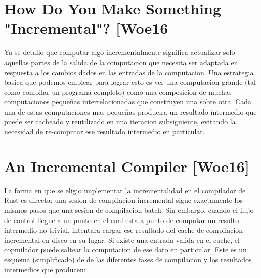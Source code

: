\documentclass[12pt, a4paper]{report}
\begin{document}
\section*{How Do You Make Something "Incremental"? [Woe16}

Ya se detallo que computar algo incrementalmente significa actualizar solo aquellas partes de la salida de la computacion que necesita ser adaptada en respuesta a los cambios dados en las entradas de la computacion.
Una estrategia basica que podemos emplear para lograr esto es ver una computacion grande (tal como compilar un programa completo) como una composicion de muchas computaciones pequeñas interrelacionadas que construyen una sobre otra.
Cada una de estas computaciones mas pequeñas producira un resultado intermedio que puede ser cacheado y reutilizado en una iteracion subsiguiente, evitando la necesidad de re-computar ese resultado intermedio en particular.
\cite{rust_blog_incremental_compilation}

\section*{An Incremental Compiler [Woe16]}

La forma en que se eligio implementar la incrementalidad en el compilador de Rust es directa: una sesion de compilacion incremental sigue exactamente los mismos pasos que una sesion de compilacion batch.
Sin embargo, cuando el flujo de control llegue a un punto en el cual esta a punto de computar un resulto intermedio no trivial, intentara cargar ese resultado del cache de compilacion incremental en disco en su lugar.
Si existe una entrada valida en el cache, el copmilador puede saltear la computacion de ese dato en particular.
Este es un esquema (simplificado) de de las diferentes fases de compilacion y los resultados intermedios que producen:
\cite{rust_blog_incremental_compilation}
\end{document}
